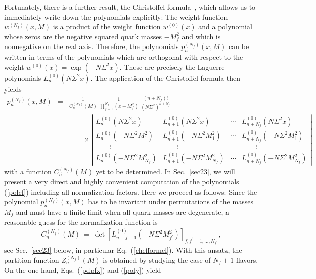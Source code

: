 Fortunately, there is a further result, the Christoffel
formula~\cite{Bate51}, which allows us to immediately write down the
polynomials explicitly: The weight function $w^{(N_f)}(x,M)$ is a
product of the weight function $w^{(0)}(x)$ and a polynomial whose
zeros are the negative squared quark masses $-M_f^2$ and which is
nonnegative on the real axis.  Therefore, the polynomials
$p_n^{(N_f)}(x,M)$ can be written in terms of the polynomials which
are orthogonal with respect to the weight
$w^{(0)}(x)=\exp(-N\Sigma^2x)$.  These are precisely the Laguerre
polynomials $L_n^{(0)}(N\Sigma^2x)$.  The application of the
Christoffel formula then yields
\begin{eqnarray}
  p_n^{(N_f)}(x,M) &=& \frac{1}{C_n^{(N_f)}(M)} \,
  \frac{1}{\prod_{f=1}^{N_f}(x+M_f^2)} \,
  \frac{(n+N_f)!}{(N\Sigma^2)^{n+N_f}} \nonumber\\
& & \qquad \times\left| \begin{array}{llcl}
  L_n^{(0)}(N\Sigma^2x) & L_{n+1}^{(0)}(N\Sigma^2x) & \cdots &
                               L_{n+N_f}^{(0)}(N\Sigma^2x) \\ 
  L_n^{(0)}(-N\Sigma^2M_1^2) & L_{n+1}^{(0)}(-N\Sigma^2M_1^2) & \cdots &
                               L_{n+N_f}^{(0)}(-N\Sigma^2M_1^2) \\ 
     \qquad\vdots & \qquad\vdots & & \qquad\vdots \\ 
  L_n^{(0)}(-N\Sigma^2M_{N_f}^2) & L_{n+1}^{(0)}(-N\Sigma^2M_{N_f}^2)
   & \cdots &  L_{n+N_f}^{(0)}(-N\Sigma^2M_{N_f}^2) 
           \end{array}\right|  
\label{polcf}
\end{eqnarray} 
with a function $C_n^{(N_f)}(M)$ yet to be determined.  In
Sec.~\ref{sec23}, we will present a very direct and highly convenient
computation of the polynomials (\ref{polcf}) including all
normalization factors.  Here we proceed as follows: Since the
polynomial $p_n^{(N_f)}(x,M)$ has to be invariant under permutations
of the masses $M_f$ and must have a finite limit when all quark masses
are degenerate, a reasonable guess for the normalization function is
\begin{eqnarray}
C_n^{(N_f)}(M) \ = \ \det\left[L_{n+f-1}^{(0)}
        (-N\Sigma^2M_{f^\prime}^2)\right]_{f,f^\prime=1,\ldots,N_f}\:,
\label{polnorm}
\end{eqnarray} 
see Sec.~\ref{sec23} below, in particular Eq.~(\ref{chefformel}).
With this ansatz, the partition function $Z_n^{(N_f)}(M)$ is obtained
by studying the case of $N_f+1$ flavors. On the one hand,
Eqs.~(\ref{pdpfx}) and (\ref{poly}) yield

